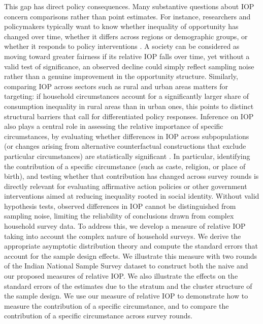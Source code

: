 \documentclass[12pt]{article}
\theoremstyle{plain}
\theoremstyle{definition}
\begin{document}
This gap has direct policy consequences. Many substantive questions about IOP concern comparisons rather than point estimates. For instance, researchers and policymakers typically want to know whether inequality of opportunity has changed over time, whether it differs across regions or
demographic groups, or whether it responds to policy interventions
\citep[e.g.,][]{ferreira2011measurement, ASADULLAH20121151}. A society can be considered as moving toward greater fairness if its relative IOP falls over time, yet without a valid test of significance, an observed decline could simply reflect sampling noise rather than a genuine improvement in the opportunity structure. Similarly, comparing IOP across sectors such as rural and urban areas matters for targeting: if household circumstances account for a significantly larger share of consumption inequality in rural areas than in urban ones, this points to distinct structural barriers that call for differentiated policy responses. Inference on IOP also plays a central role in assessing the relative importance of specific circumstances, by evaluating whether differences in IOP across subpopulations (or changes arising from alternative counterfactual constructions that exclude particular circumstances) are statistically significant \citep[e.g.,][]{Brunori, lefranc2009equality}. In particular, identifying the contribution of a specific circumstance (such as caste, religion, or place of birth), and testing whether that contribution has changed across survey rounds is directly relevant for evaluating affirmative action policies or other government interventions aimed at reducing inequality rooted in social identity. Without valid hypothesis tests, observed differences in IOP cannot be distinguished from sampling noise, limiting the reliability of
conclusions drawn from complex household survey data. To address this, we develop a measure of relative IOP taking into account the complex nature of household surveys. We derive the appropriate asymptotic distribution theory and compute the standard errors that account for the sample design effects. We illustrate this measure with two rounds of the Indian National Sample Survey dataset to construct both the naive and our proposed measures of relative IOP. We also illustrate the effects on the standard errors of the estimates due to the stratum and the cluster structure of the sample design. We use our measure of relative IOP to demonstrate how to measure the contribution of a specific circumstance, and to compare the contribution of a specific circumstance across survey rounds. 
\end{document}
